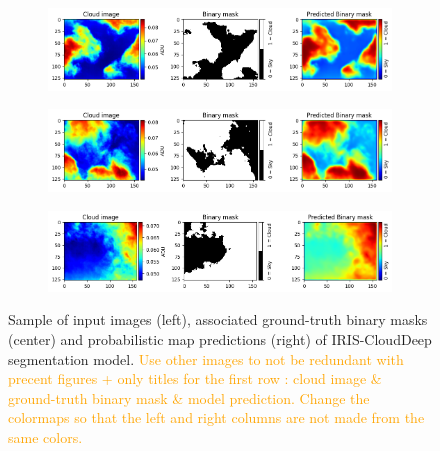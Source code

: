 \documentclass[amt, article]{copernicus}
\begin{document}
\begin{figure}[t]
    \centering
    
    \begin{subfigure}{\textwidth}
        \centering
        \includegraphics[width=1.0\linewidth]{figures/test_dl_15epochs.png}
    \end{subfigure}
    
    \begin{subfigure}{\textwidth}
        \centering
        \includegraphics[width=1.0\linewidth]{figures/test_dl_15epochs2.png}
    \end{subfigure}
    
    \begin{subfigure}{\textwidth}
        \centering
        \includegraphics[width=1.0\linewidth]{figures/test_dl_15epochs3.png}
    \end{subfigure}

    \caption{Sample of input images (left), associated ground-truth binary masks (center) and probabilistic map predictions (right) of IRIS-CloudDeep segmentation model. \textcolor{orange}{Use other images to not be redundant with precent figures + only titles for the first row : cloud image \& ground-truth binary mask \& model prediction. Change the colormaps so that the left and right columns are not made from the same colors.}}
    \label{fig:sample_segmentation}
\end{figure}
\end{document}
